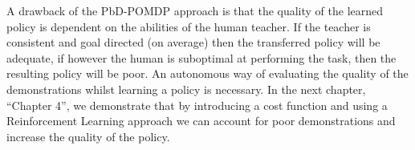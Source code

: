 A drawback of the PbD-POMDP approach is that the quality of the learned policy is dependent on the abilities 
of the human teacher. If the teacher is consistent and goal directed (on average) then the transferred policy will be adequate, if however
the human is suboptimal at performing the task, then the resulting policy will be poor. An autonomous way of
evaluating the quality of the demonstrations whilst learning a policy is necessary. In the next chapter, ``Chapter 4'', we 
demonstrate that by introducing a cost function and using a Reinforcement Learning approach we can account
for poor demonstrations and increase the quality of the policy.

















